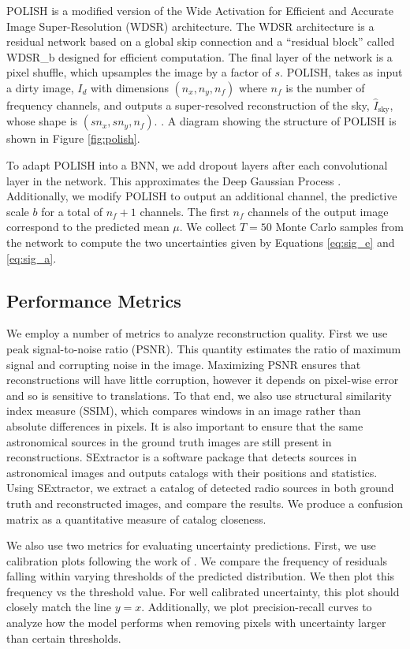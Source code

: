 \documentclass{article}
\begin{document}
POLISH is a modified version of the Wide Activation for Efficient and Accurate Image Super-Resolution (WDSR) \cite{Yu2018} architecture. The WDSR architecture is a residual network based on a global skip connection and a ``residual block'' called WDSR\_b designed for efficient computation. The final layer of the network is a pixel shuffle, which upsamples the image by a factor of $s$. POLISH, takes as input a dirty image, $I_d$ with dimensions $(n_x, n_y, n_f)$ where $n_f$ is the number of frequency channels, and outputs a
super-resolved reconstruction of the sky, $\hat{I}_{\text{sky}}$, whose shape is $(sn_x, sn_y, n_f)$. \cite{connor2021deep}. A diagram showing the structure of POLISH is shown in Figure \ref{fig:polish}.

To adapt POLISH into a BNN, we add dropout layers after each convolutional layer in the network. This approximates the Deep Gaussian Process \cite{gal2016dropout}. Additionally, we modify POLISH to output an additional channel, the predictive scale $b$ for a total of $n_f + 1$ channels. The first $n_f$ channels of the output image correspond to the predicted mean $\mu$. We collect $T = 50$ Monte Carlo samples from the network to compute the two uncertainties given by Equations \ref{eq:sig_e} and \ref{eq:sig_a}.

\subsection{Performance Metrics}
We employ a number of metrics to analyze reconstruction quality. First we use peak signal-to-noise ratio (PSNR). This quantity estimates the ratio of maximum signal and corrupting noise in the image. Maximizing PSNR ensures that reconstructions will have little corruption, however it depends on pixel-wise error and so is sensitive to translations. To that end, we also use structural similarity index measure (SSIM), which compares windows in an image rather than absolute differences in pixels. It is also important to ensure that the same astronomical sources in the ground truth images are still present in reconstructions. SExtractor \cite{SExtractor} is a software package that detects sources in astronomical images and outputs catalogs with their positions and statistics. Using SExtractor, we extract a catalog of detected radio sources in both ground truth and reconstructed images, and compare the results. We produce a confusion matrix as a quantitative measure of catalog closeness. 

We also use two metrics for evaluating uncertainty predictions. First, we use calibration plots following the work of \citet{Kendall2017}. We compare the frequency of residuals falling within varying thresholds of the predicted distribution. We then plot this frequency vs the threshold value. For well calibrated uncertainty, this plot should closely match the line $y=x$. Additionally, we plot precision-recall curves to analyze how the model performs when removing pixels with uncertainty larger than certain thresholds.
\end{document}
